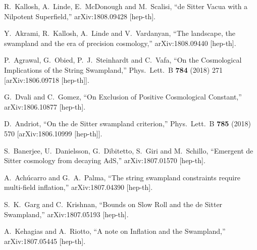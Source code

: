 \documentclass[11pt,a4paper]{article}
\begin{document}
\begin{thebibliography}{99}
  R.~Kallosh, A.~Linde, E.~McDonough and M.~Scalisi,
  ``de Sitter Vacua with a Nilpotent Superfield,''
  arXiv:1808.09428 [hep-th].


  Y.~Akrami, R.~Kallosh, A.~Linde and V.~Vardanyan,
  ``The landscape, the swampland and the era of precision cosmology,''
  arXiv:1808.09440 [hep-th].


  P.~Agrawal, G.~Obied, P.~J.~Steinhardt and C.~Vafa,
  ``On the Cosmological Implications of the String Swampland,''
  Phys.\ Lett.\ B {\bf 784} (2018) 271
  [arXiv:1806.09718 [hep-th]].


  G.~Dvali and C.~Gomez,
  ``On Exclusion of Positive Cosmological Constant,''
  arXiv:1806.10877 [hep-th].

  D.~Andriot,
  ``On the de Sitter swampland criterion,''
  Phys.\ Lett.\ B {\bf 785} (2018) 570
  [arXiv:1806.10999 [hep-th]].
  
  S.~Banerjee, U.~Danielsson, G.~Dibitetto, S.~Giri and M.~Schillo,
  ``Emergent de Sitter cosmology from decaying AdS,''
  arXiv:1807.01570 [hep-th].

  A.~Achúcarro and G.~A.~Palma,
  ``The string swampland constraints require multi-field inflation,''
  arXiv:1807.04390 [hep-th].

  S.~K.~Garg and C.~Krishnan,
  ``Bounds on Slow Roll and the de Sitter Swampland,''
  arXiv:1807.05193 [hep-th].

  A.~Kehagias and A.~Riotto,
  ``A note on Inflation and the Swampland,''
  arXiv:1807.05445 [hep-th].


\end{thebibliography}
\end{document}
